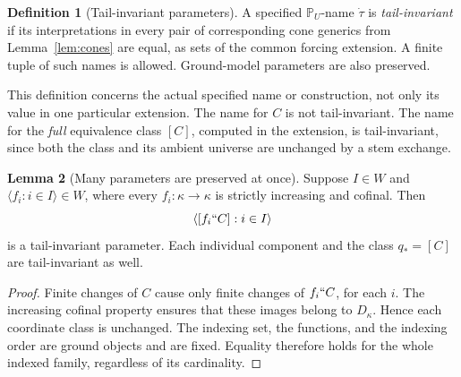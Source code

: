 \documentclass[11pt,letterpaper]{article}
\theoremstyle{definition}
\newtheorem{definition}{Definition}[section]
\newtheorem{lemma}[definition]{Lemma}
\numberwithin{equation}{section}
\newcommand{\PP}{\mathbb P}
\begin{document}
\begin{definition}[Tail-invariant parameters]\label{def:invariant}
A specified $\PP_U$-name $\dot\tau$ is \emph{tail-invariant} if its interpretations in every pair of corresponding cone generics from Lemma~\ref{lem:cones} are equal, as sets of the common forcing extension. A finite tuple of such names is allowed. Ground-model parameters are also preserved.
\end{definition}

This definition concerns the actual specified name or construction, not only its value in one particular extension. The name for $C$ is not tail-invariant. The name for the \emph{full} equivalence class $[C]$, computed in the extension, is tail-invariant, since both the class and its ambient universe are unchanged by a stem exchange.

\begin{lemma}[Many parameters are preserved at once]\label{lem:parameters}
Suppose $I\in W$ and $\langle f_i:i\in I\rangle\in W$, where every $f_i:\kappa\to\kappa$ is strictly increasing and cofinal. Then
\[
 \left\langle[f_i``C]:i\in I\right\rangle
\]
is a tail-invariant parameter. Each individual component and the class $q_*=[C]$ are tail-invariant as well.
\end{lemma}
\begin{proof}
Finite changes of $C$ cause only finite changes of $f_i``C$, for each $i$. The increasing cofinal property ensures that these images belong to $D_\kappa$. Hence each coordinate class is unchanged. The indexing set, the functions, and the indexing order are ground objects and are fixed. Equality therefore holds for the whole indexed family, regardless of its cardinality.
\end{proof}
\end{document}
